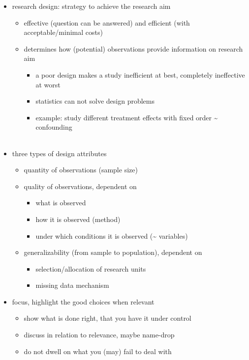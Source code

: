 \documentclass[
]{article}
\providecommand{\tightlist}{%
  \setlength{\itemsep}{0pt}\setlength{\parskip}{0pt}}
\begin{document}
\begin{itemize}
\tightlist
\item
  research design: strategy to achieve the research aim

  \begin{itemize}
  \tightlist
  \item
    effective (question can be answered) and efficient (with
    acceptable/minimal costs)
  \item
    determines how (potential) observations provide information on
    research aim

    \begin{itemize}
    \tightlist
    \item
      a poor design makes a study inefficient at best, completely
      ineffective at worst
    \item
      statistics can not solve design problems
    \item
      example: study different treatment effects with fixed order
      \textasciitilde{} confounding\\
      ~\\
    \end{itemize}
  \end{itemize}
\item
  three types of design attributes

  \begin{itemize}
  \tightlist
  \item
    quantity of observations (sample size)
  \item
    quality of observations, dependent on

    \begin{itemize}
    \tightlist
    \item
      what is observed
    \item
      how it is observed (method)
    \item
      under which conditions it is observed (\textasciitilde{}
      variables)
    \end{itemize}
  \item
    generalizability (from sample to population), dependent on

    \begin{itemize}
    \tightlist
    \item
      selection/allocation of research units
    \item
      missing data mechanism\\
    \end{itemize}
  \end{itemize}
\item
  focus, highlight the good choices when relevant

  \begin{itemize}
  \tightlist
  \item
    show what is done right, that you have it under control
  \item
    discuss in relation to relevance, maybe name-drop
  \item
    do not dwell on what you (may) fail to deal with\\
  \end{itemize}
\end{itemize}
\end{document}
